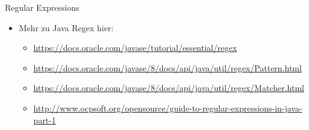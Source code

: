 \documentclass[18pt]{beamer}
\begin{document}
\begin{frame}{Regular Expressions}
    \begin{itemize}
        \item Mehr zu Java Regex hier:
        \vspace{.2in}
        \begin{itemize}
            \item \url{https://docs.oracle.com/javase/tutorial/essential/regex}
            \item \url{https://docs.oracle.com/javase/8/docs/api/java/util/regex/Pattern.html}
            \item \url{https://docs.oracle.com/javase/8/docs/api/java/util/regex/Matcher.html}
            \item \url{http://www.ocpsoft.org/opensource/guide-to-regular-expressions-in-java-part-1}
        \end{itemize}
    \end{itemize}
\end{frame}
\end{document}

